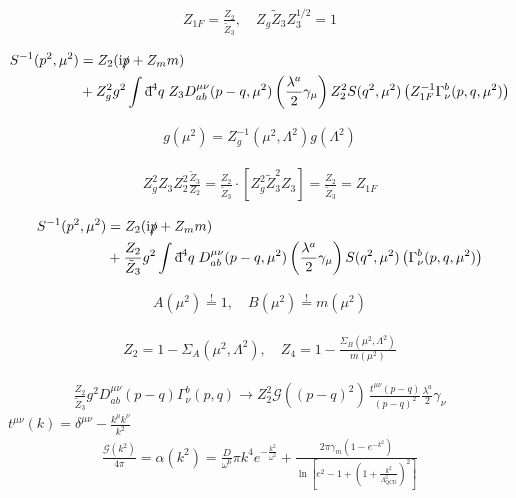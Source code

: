 \documentclass[oneside, openany]{book}
\numberwithin{equation}{chapter}
\numberwithin{figure}{chapter}
\newcommand{\ii}{\mathrm{i}}
\newcommand{\dbar}{\mathord{\mathrm{d}\mkern-8mu\raisebox{0.55em}{\rule{0.38em}{0.05em}}\mkern0.1mu}}
\newcommand{\p}[0]{\slashed{p}}
\newcommand{\g}[0]{\gamma}
\begin{document}
\begin{align}
	Z_{1F} = \frac{Z_2}{\tilde Z_3}, \quad Z_g \tilde Z_3 Z_3^{1/2} = 1
\end{align}

\begin{align}
	S^{-1}(p^2, \mu^2) &= Z_2(\ii \p + Z_m m) \\
	&+ Z_g^2 g^2 \int \dbar^4 q \; Z_3 D_{ab}^{\mu\nu}(p-q, \mu^2)\left( \frac{\lambda^a}{2}\g_\mu \right)Z_2^2 S(q^2, \mu^2) \left( Z_{1F}^{-1} \Gamma^b_\nu(p, q, \mu^2) \right)
\end{align}

\begin{align}
	g(\mu^2) = Z_g^{-1}(\mu^2,\Lambda^2) g(\Lambda^2)
\end{align}

\begin{align}
	Z_g^2 Z_3 Z_2^2 \frac{\tilde Z_3}{Z_2} = \frac{Z_2}{\tilde Z_3} \cdot \left[Z_g^2 \tilde Z_3^2 Z_3\right] = \frac{Z_2}{\tilde Z_3} = Z_{1F}
\end{align}

\begin{align}
	S^{-1}(p^2, \mu^2) &= Z_2(\ii \p + Z_m m) \\
	&+ \frac{Z_2}{\tilde Z_3} g^2 \int \dbar^4 q \; D_{ab}^{\mu\nu}(p-q, \mu^2)\left( \frac{\lambda^a}{2}\g_\mu \right) S(q^2, \mu^2) \left( \Gamma^b_\nu(p, q, \mu^2) \right)
\end{align}

\begin{align}
	A(\mu^2) \overset{!}{=} 1, \quad B(\mu^2) \overset{!}{=} m(\mu^2)
\end{align}

\begin{align}
	Z_2 = 1 - \Sigma_A(\mu^2, \Lambda^2), \quad Z_4 = 1 - \frac{\Sigma_B(\mu^2, \Lambda^2)}{m(\mu^2)}
\end{align}

\begin{align}
	\frac{Z_2}{\tilde Z_3} g^2 D_{ab}^{\mu\nu}(p-q) \Gamma_\nu^b(p,q) \rightarrow Z_2^2 \mathcal G\left((p-q)^2\right)\, \frac{t^{\mu\nu}(p-q)}{(p-q)^2}\frac{\lambda^a}{2}\g_\nu
\end{align}
$t^{\mu\nu}(k) = \delta^{\mu\nu} - \frac{k^\mu k^\nu}{k^2}$
\begin{align}
	\frac{\mathcal{G}(k^2)}{4\pi} = \alpha(k^2) = \frac{D}{\omega^6} \pi k^4 e^{-\tfrac{k^2}{\omega^2}} + \frac{2\pi \gamma_m \left( 1-e^{-k^2} \right)}{\ln\left[ e^2-1+\left( 1+\tfrac{k^2}{\Lambda_\mathrm{QCD}^2} \right)^2 \right]}
\end{align}
\end{document}

